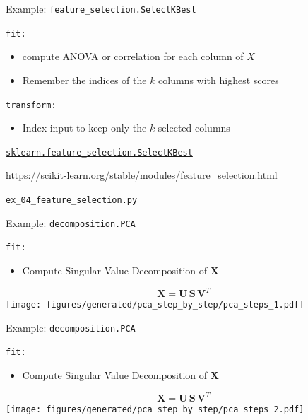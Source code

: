 \documentclass[presentation,mathserif,table]{beamer}
\newcommand{\X}{{\mathbold X}}
\newcommand{\bS}{{\mathbold S}}
\newcommand{\U}{{\mathbold U}}
\newcommand{\V}{{\mathbold V}}
\begin{document}
\begin{frame}[label={sec:org7e8010e},fragile]{Example: \texttt{feature\_selection.SelectKBest}}
 \begin{block}{\texttt{fit:}}
\begin{itemize}
\item compute ANOVA or correlation for each column of \(X\)
\item Remember the indices of the \(k\) columns with highest scores
\end{itemize}
\end{block}
\begin{block}{\texttt{transform:}}
\begin{itemize}
\item Index input to keep only the \(k\) selected columns
\end{itemize}
\end{block}


\begin{structureenv} %
\href{https://scikit-learn.org/stable/modules/generated/sklearn.feature\_selection.SelectKBest.html\#sklearn.feature\_selection.SelectKBest}{\texttt{sklearn.feature\_selection.SelectKBest}}

\url{https://scikit-learn.org/stable/modules/feature\_selection.html}

\texttt{ex\_04\_feature\_selection.py}
\end{structureenv}
\end{frame}
\begin{frame}[label={sec:org6cbd1a5},fragile]{Example: \texttt{decomposition.PCA}}
 \begin{block}{\texttt{fit:}}
\begin{itemize}
\item Compute Singular Value Decomposition of \(\X\)
\end{itemize}
\begin{structureenv} %
\begin{equation}
\X = \U \, \bS \, \V^T
\end{equation}
\texttt{[image: figures/generated/pca\_step\_by\_step/pca\_steps\_1.pdf]}
\end{structureenv}
\end{block}
\end{frame}

\begin{frame}[label={sec:orgbaa717e},fragile]{Example: \texttt{decomposition.PCA}}
 \begin{block}{\texttt{fit:}}
\begin{itemize}
\item Compute Singular Value Decomposition of \(\X\)
\end{itemize}
\begin{structureenv} %
\begin{equation}
\X = \U \, \bS \, \V^T
\end{equation}
\texttt{[image: figures/generated/pca\_step\_by\_step/pca\_steps\_2.pdf]}
\end{structureenv}
\end{block}
\end{frame}
\end{document}
